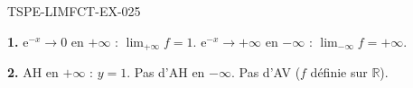 \begin{corrige}{TSPE-LIMFCT-EX-025}

\textbf{1.} $\mathrm{e}^{-x} \to 0$ en $+\infty$ : $\lim_{+\infty} f = \boxed{1}$. $\mathrm{e}^{-x} \to +\infty$ en $-\infty$ : $\lim_{-\infty} f = \boxed{+\infty}$.

\textbf{2.} AH en $+\infty$ : $y = 1$. Pas d'AH en $-\infty$. Pas d'AV ($f$ définie sur $\mathbb{R}$).

\end{corrige}
